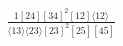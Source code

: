 \documentclass[varwidth, border=5pt]{standalone}
\begin{document}
\begin{my}
$\begin{gathered}
\scriptscriptstyle\frac{1[24][34]^2[12]⟨12⟩}{⟨13⟩⟨23⟩[23]^2[25][45]}
\end{gathered}$
\end{my}
\end{document}
